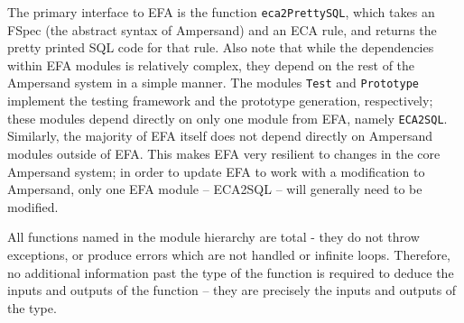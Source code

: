 
The primary interface to EFA is the function \lstinline{eca2PrettySQL}, which 
takes an FSpec (the abstract syntax of Ampersand) and an ECA rule, and returns 
the pretty
printed SQL code for that rule. Also note that while the dependencies within EFA
modules is relatively complex, they depend on the rest of the Ampersand system
in a simple manner. The modules \lstinline{Test} and \lstinline{Prototype} 
implement the testing
framework and the prototype generation, respectively; these modules depend
directly on only one module from EFA, namely \lstinline{ECA2SQL}. Similarly, the
majority of EFA itself does not depend directly on Ampersand modules outside of
EFA. This makes EFA very resilient to changes in the core Ampersand system; in
order to update EFA to work with a modification to Ampersand, only one EFA
module -- ECA2SQL -- will generally need to be modified. 

All functions named in the module hierarchy are total - they do not throw
exceptions, or produce errors which are not handled or infinite loops. 
Therefore, no
additional information past the type of the function is required to deduce the
inputs and outputs of the function -- they are precisely the inputs and outputs
of the type.


